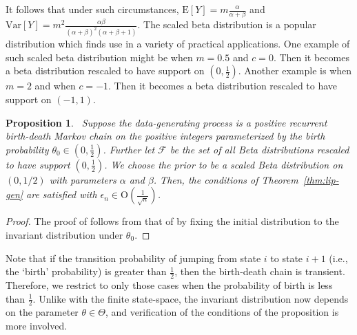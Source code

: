 \documentclass[11pt]{amsart}
\newcommand{\E}{\mathrm{E}}
\newcommand{\Var}{\mathrm{Var}}
\newtheorem{proposition}{Proposition}[section]
\begin{document}
It follows that under such circumstances, $\E[Y]=m\frac{\alpha}{\alpha+\beta}$ and $\Var[Y]=m^2\frac{\alpha\beta}{(\alpha+\beta)^2(\alpha+\beta+1)}$.
The scaled beta distribution is a popular distribution which finds use in a variety of practical applications. One example of such scaled beta distribution might be when $m=0.5$ and $c=0$. Then it becomes a beta distribution rescaled to have support on $(0,\frac{1}{2})$. Another example is when $m=2$ and when $c=-1$. Then it becomes a beta distribution rescaled to have support on $(-1,1)$.
%
\begin{proposition}~\label{thm:bd2}
Suppose the data-generating process is a positive recurrent birth-death Markov chain on the positive integers parameterized by the birth probability $\theta_0\in(0,\frac{1}{2})$.  Further let $\mathcal{F}$ be the set of all Beta distributions rescaled to have support $(0,\frac{1}{2})$. We choose the prior to be a scaled Beta distribution on $(0,1/2)$ with parameters $\alpha$ and $\beta$. Then, the conditions of Theorem~\ref{thm:lip-gen} are satisfied with $\epsilon_n\in\mathrm{O}\left(\frac{1}{\sqrt{n}}\right)$.
\end{proposition}
%
\begin{proof}
The proof of  follows from that of  by fixing the initial distribution to the invariant distribution under $\theta_0$.
\end{proof}
%
Note that if the transition probability of jumping from state $i$ to state $i+1$ (i.e., the `birth' probability) is greater than $\frac{1}{2}$, then the birth-death chain is transient. Therefore, we restrict to only those cases when the probability of birth is less than $\frac{1}{2}$. 
Unlike with the finite state-space, %
the invariant distribution now depends on the parameter $\theta \in \Theta$, and verification of the conditions of the proposition is more involved. 
\end{document}
